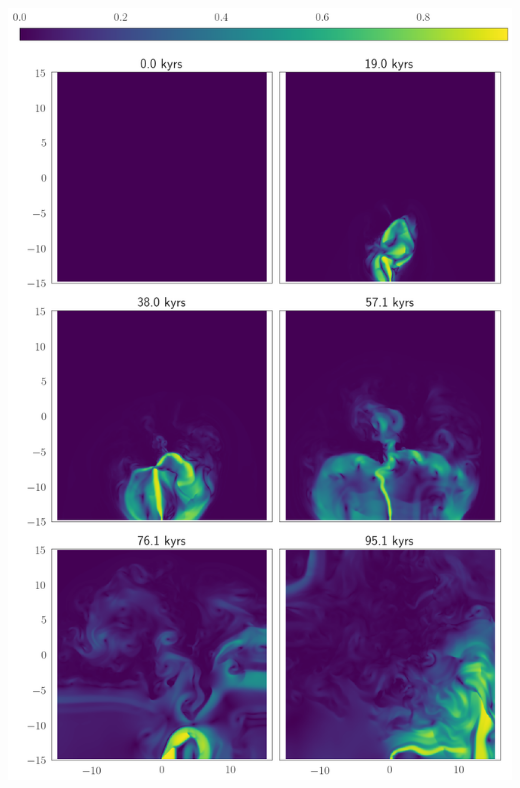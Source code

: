 \documentclass{beamer}
\begin{document}
\begin{frame}
\begin{columns}
\begin{center}
				\includegraphics[width=0.925\linewidth]{../Document/DataImages/JetCloudV}
			\end{center}
	\end{columns}
\end{frame}
\end{document}
